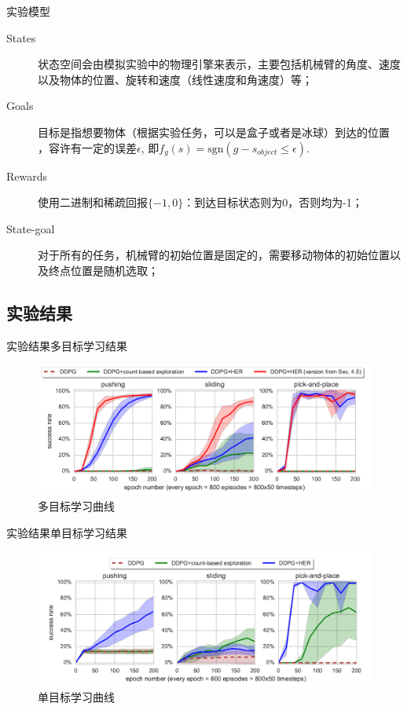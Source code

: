 \documentclass[10pt]{beamer}
\newcommand{\sgn}{\textrm{sgn}}
\begin{document}
	\begin{frame}{实验}{模型}
		\begin{description}
			\item[States] 状态空间会由模拟实验中的物理引擎来表示，主要包括机械臂的角度、速度以及物体的位置、旋转和速度（线性速度和角速度）等；
			
			\item[Goals] 目标是指想要物体（根据实验任务，可以是盒子或者是冰球）到达的位置 ，容许有一定的误差$\epsilon$, 即$f_g(s) = \sgn(g-s_{object} \leq \epsilon)$. 
			
			\item[Rewards] 使用二进制和稀疏回报$\{−1,0\}$：到达目标状态则为0，否则均为-1；
			
			\item[State-goal] 对于所有的任务，机械臂的初始位置是固定的，需要移动物体的初始位置以及终点位置是随机选取；
			
		\end{description}
	\end{frame}
	
	\subsection{实验结果}
	
	\begin{frame}{实验结果}{多目标学习结果}
		\begin{figure}
			\centering
			\includegraphics[width=0.7\linewidth]{pictures/multi-goal-expr}
			\caption{多目标学习曲线}
			\label{fig:multi-goal-expr}
		\end{figure}
		
	\end{frame}

	\begin{frame}{实验结果}{单目标学习结果}
		\begin{figure}
			\centering
			\includegraphics[width=0.7\linewidth]{pictures/single-goal-expr}
			\caption{单目标学习曲线}
			\label{fig:single-goal-expr}
		\end{figure}
		
	\end{frame}
\end{document}
